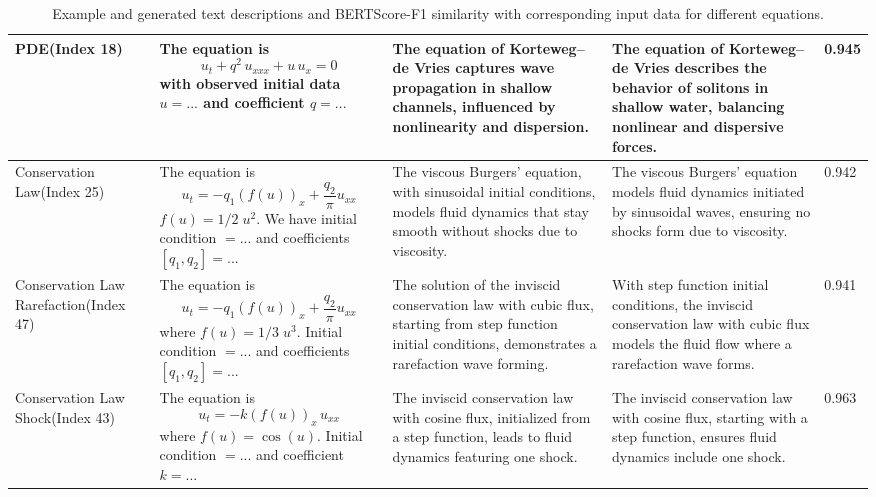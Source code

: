 \documentclass{article}
\begin{document}
\begin{table}[H]
\begin{tabular}{|m{1.9cm}|m{5.3cm}|m{3.8cm}|m{3.8cm}|m{1cm}|}
PDE\newline(Index 18) &
The equation is $$u_t + q^2\,u_{xxx} + u\,u_x = 0$$ with observed initial data $u= ...$ and coefficient $q = ...$
 &
The equation of Korteweg–de Vries captures wave propagation in shallow channels, influenced by nonlinearity and dispersion. &
The equation of Korteweg–de Vries describes the behavior of solitons in shallow water, balancing nonlinear and dispersive forces. &
0.945 \\ \hline

Conservation Law\newline(Index 25) &
The equation is 
$$u_t = -q_1(f(u))_x + \frac{q_2}{\pi} u_{xx}$$  $f(u) = 1/2\; u^2$. We have initial condition $= ...$ and coefficients $[q_1, q_2] = ...$
 &
The viscous Burgers' equation, with sinusoidal initial conditions, models fluid dynamics that stay smooth without shocks due to viscosity. &
The viscous Burgers' equation models fluid dynamics initiated by sinusoidal waves, ensuring no shocks form due to viscosity. &
0.942 \\ \hline

Conservation Law Rarefaction\newline(Index 47) &
The equation is 
$$u_t = -q_1(f(u))_x + \frac{q_2}{\pi} u_{xx}$$ where $f(u) = 1/3\; u^3$. Initial condition $= ...$ and coefficients $[q_1, q_2] = ...$
 &
The solution of the inviscid conservation law with cubic flux, starting from step function initial conditions, demonstrates a rarefaction wave forming. &
With step function initial conditions, the inviscid conservation law with cubic flux models the fluid flow where a rarefaction wave forms. &
0.941 \\ \hline

Conservation Law Shock\newline(Index 43) &
The equation is 
$$u_t = -k(f(u))_x\,u_{xx}$$
where $f(u) = \cos(u)$. Initial condition  $= ...$ and coefficient $k = ...$
 &
The inviscid conservation law with cosine flux, initialized from a step function, leads to fluid dynamics featuring one shock. &
The inviscid conservation law with cosine flux, starting with a step function, ensures fluid dynamics include one shock. &
0.963 \\ \hline
\end{tabular}
\caption{Example and generated text descriptions and BERTScore-F1 similarity with corresponding input data for different equations.}
\label{tab:description_comparison}
\end{table}
\end{document}
